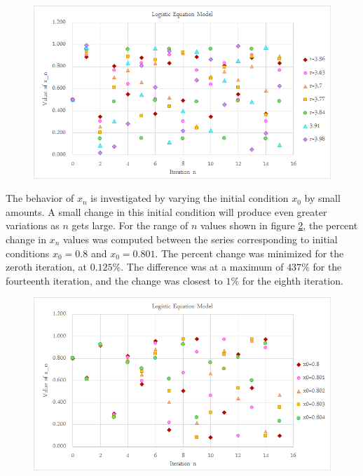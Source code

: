 \documentclass[a4paper]{article}
\begin{document}
\begin{figure}[H]
\centering
\includegraphics[width=1\textwidth]{chaos1.png}
\label{chaos1}
\end{figure}

The behavior of $x_n$ is investigated by varying the initial condition $x_0$ by small amounts. A small change in this initial condition will produce even greater variations as $n$ gets large. For the range of $n$ values shown in figure \ref{varyx0}, the percent change in $x_n$ values was computed between the series corresponding to initial conditions $x_0=0.8$ and $x_0=0.801$. The percent change was minimized for the zeroth iteration, at $0.125\%$. The difference was at a maximum of $437\%$ for the fourteenth iteration, and the change was closest to $1\%$ for the eighth iteration.

\begin{figure}[H]
\centering
\includegraphics[width=1\textwidth]{varyx0.png}
\label{varyx0}
\end{figure}
\end{document}
